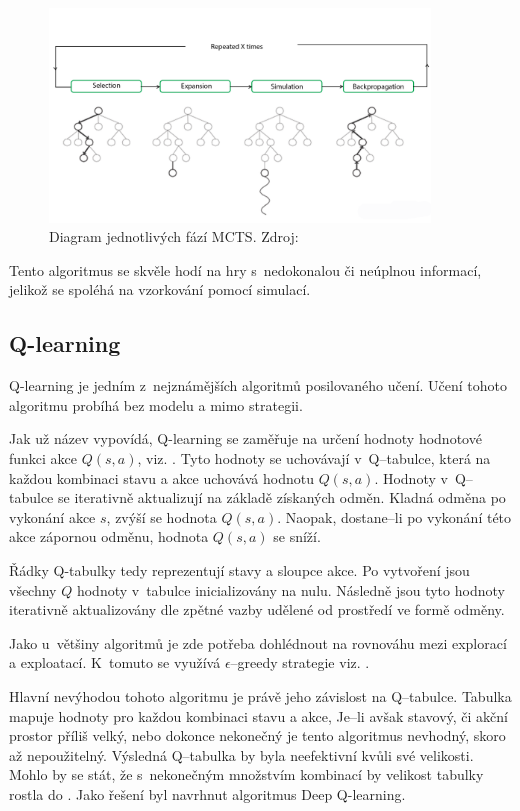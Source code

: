 \begin{figure}[H]
	\centering
	\includegraphics[width=0.9\textwidth]{obrazky-figures/mcts}
	\caption{Diagram jednotlivých fází MCTS.\@
  Zdroj: \cite{mcts_geeksforgeeks}}\label{fig:mcts}
\end{figure}

Tento algoritmus se skvěle hodí na hry s~nedokonalou či neúplnou informací, jelikož se spoléhá na vzorkování pomocí simulací.

\subsection{Q-learning}\label{subsec:q-learning}

Q-learning je jedním z~nejznámějších algoritmů posilovaného učení.
Učení tohoto algoritmu probíhá bez modelu a mimo strategii.

Jak už název vypovídá, Q-learning se zaměřuje na určení hodnoty hodnotové funkci akce $Q(s, a)$, viz. .
Tyto hodnoty se uchovávají v~Q--tabulce, která na každou kombinaci stavu a akce uchovává hodnotu $Q(s, a)$.
Hodnoty v~Q--tabulce se iterativně aktualizují na základě získaných odměn.
Kladná odměna po vykonání akce $s$, zvýší se hodnota $Q(s, a)$.
Naopak, dostane--li po vykonání této akce zápornou odměnu, hodnota $Q(s, a)$ se sníží.

Řádky Q-tabulky tedy reprezentují stavy a sloupce akce.
Po vytvoření jsou všechny $Q$ hodnoty v~tabulce inicializovány na nulu.
Následně jsou tyto hodnoty iterativně aktualizovány dle zpětné vazby udělené od prostředí ve formě odměny.

Jako u~většiny algoritmů je zde potřeba dohlédnout na rovnováhu mezi explorací a exploatací.
K~tomuto se využívá $\epsilon$--greedy strategie viz. .

Hlavní nevýhodou tohoto algoritmu je právě jeho závislost na Q--tabulce.
Tabulka mapuje hodnoty pro každou kombinaci stavu a akce,
Je--li avšak stavový, či akční prostor příliš velký, nebo dokonce nekonečný je tento algoritmus nevhodný, skoro až nepoužitelný.
Výsledná Q--tabulka by byla neefektivní kvůli své velikosti.
Mohlo by se stát, že s~nekonečným množstvím kombinací by velikost tabulky rostla do .
Jako řešení byl navrhnut algoritmus Deep Q-learning.

